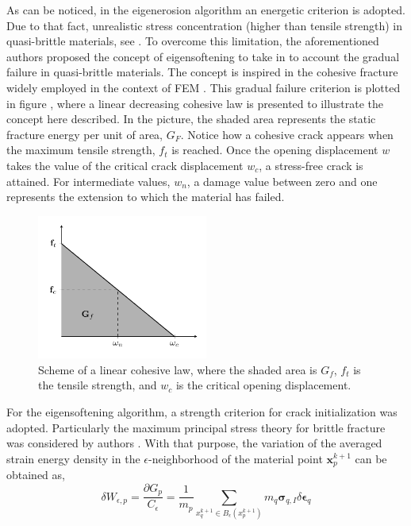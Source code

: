 \message{ !name(2020_EFM_MPM_Eigensoftening.tex)}\documentclass[preprint,12pt,a4paper]{elsarticle}
\newcommand{\vec}[1]{
  \ensuremath{\mathbf{{#1}}}
}
\newcommand{\tens}[1]{
  \ensuremath{\mathbf{{#1}}}
}
\begin{document}
As can be noticed, in the eigenerosion algorithm an energetic
criterion is adopted. Due to that fact, unrealistic stress
concentration (higher than tensile strength) in quasi-brittle materials, see
\cite{Navas_2017_ES}. To overcome this limitation, the aforementioned
authors proposed the concept of eigensoftening to take in to account
the gradual failure in quasi-brittle materials. The concept is
inspired in the cohesive fracture widely employed in the context of
FEM \cite{Ortiz_1999}. This gradual failure criterion is plotted in
figure \label{fig:Damage-ft-wc}, where a linear decreasing cohesive
law is presented to illustrate the concept here described. In the
picture, the shaded area represents the static fracture energy per
unit of area, $G_F$. Notice how a cohesive crack appears when the
maximum tensile strength, $f_t$ is reached. Once the opening
displacement $w$ takes the value of the critical crack displacement
$w_c$, a stress-free crack is attained. For intermediate values,
$w_n$, a damage value between zero and one represents the extension to
which the material has failed.
\begin{figure}
  \centering
  \includegraphics[width=0.5\textwidth]{Figures/Damage}
  \caption{Scheme of a linear cohesive law, where the shaded area is
    $G_f$, $f_t$ is the tensile strength, and $w_c$ is the critical
    opening displacement.}
  \label{fig:Damage-ft-wc}
\end{figure}
For the eigensoftening algorithm, a strength criterion for crack
initialization was adopted. Particularly the maximum principal stress
theory for brittle fracture was considered by authors
\cite{Navas_2017_ES}. With that purpose, the variation of the averaged strain
energy density in the $\epsilon$-neighborhood of the material point
$\vec{x}_p^{k+1}$ can be obtained as,
\begin{equation}
  \label{eq:variation-averaged-strain-energy-density}
  \delta W_{\epsilon,p} = \frac{\partial G_p}{C_{\epsilon}} =
  \frac{1}{m_p} \sum_{x_q^{k+1} \in
  B_{\epsilon}(x_p^{k+1})} m_q \tens{\sigma}_{q,I} \delta \tens{\epsilon}_q
\end{equation}
\end{document}
